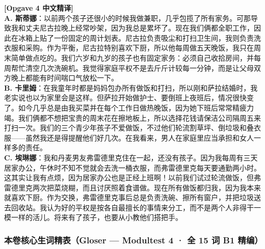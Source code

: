 \begin{answerbox}
\textbf{\color{NCDTeal}[Opgave 4 中文精译]}\\
\textbf{A. 斯蒂娜}：以前两个孩子还很小的时候我做兼职，几乎包揽了所有家务。可那导致我和丈夫尼古拉晚上经常吵架，因为我总是累坏了。现在我们俩都全职工作，因此在冰箱上贴了一份固定的周计划表。尼古拉负责吸尘和打扫卫生间，我则负责洗衣服和采购。作为平衡，尼古拉特别喜欢下厨，所以他每周做五天晚饭，我只在周末简单做点吃的。我们六岁和九岁的孩子也有固定家务：必须自己收拾房间，并每周帮忙清空几次洗碗机。我觉得家庭平权不是去斤斤计较每一分钟，而是让父母双方晚上都能有时间喘口气放松一下。\\
\textbf{B. 卡里姆}：在我童年时都是妈妈包办所有做饭和打扫，所以刚和萨拉结婚时，我老实说也以为家里会是这样。但萨拉开始做护士、要倒班上夜班后，情况很快变了。如今几乎总是由我买菜并在每个工作日做热晚饭，因为她下班后常常精疲力竭。我们俩都不想把宝贵的周末花在擦地板上，所以选择花钱请保洁公司隔周五来打扫一次。我们的三个青少年孩子不爱做饭，不过他们轮流割草坪、倒垃圾和叠衣服——虽然我还是得提醒他们好几次。在我看来，男人在家庭里应当承担和女人一样多的责任。\\
\textbf{C. 埃琳娜}：我和丹麦男友弗雷德里克住在一起，还没有孩子。因为我每周有三天居家办公，午休时不知不觉就会去洗一桶衣服，而弗雷德里克每天要通勤两小时。这其实让我有点烦，因为居家办公也是正经上班啊！以前我们试过轮流做饭，但弗雷德里克两次把菜烧糊，而且讨厌照着食谱做。现在所有做饭都归我，因为我本来就喜欢下厨。作为交换，弗雷德里克事后总是负责洗碗、擦所有窗户，并把垃圾送去回收站。我认为好的平权是按各自最擅长的事情来分工，而不是两个人非得干一模一样的活儿。将来有了孩子，也要从小教他们搭把手。
\end{answerbox}

\subsubsection*{本卷核心生词精表（Gloser --- Modultest 4 · 全 15 词 B1 精编）}

